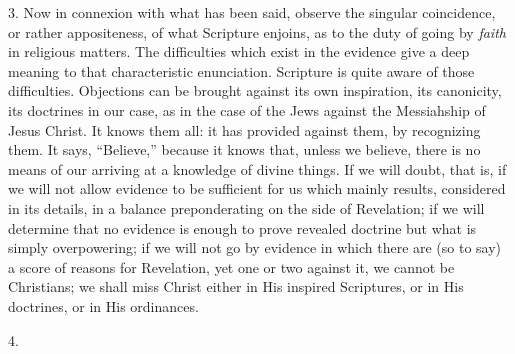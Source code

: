 3. Now in connexion with what has been said, observe the singular
coincidence, or rather appositeness, of what Scripture enjoins, as to
the duty of going by \emph{faith} in religious matters. The
difficulties which exist in the evidence give a deep meaning to that
characteristic enunciation. Scripture is quite aware of those
difficulties. Objections can be brought against its own inspiration,
its canonicity, its doctrines in our case, as in the case of the Jews
against the Messiahship of Jesus Christ. It knows them all: it has
provided against them, by recognizing them. It says,
``Believe,'' because it knows that, unless we believe, there
is no means of our arriving at a knowledge of divine things. If we
will doubt, that is, if we will not allow evidence to be sufficient
for us which mainly results, considered in its details, in a balance
preponderating on the side of Revelation; if we will determine that no
evidence is enough to prove revealed doctrine but what is simply
overpowering; if we will not go by evidence in which there are (so to
say) a score of reasons for Revelation, yet one or two against it, we
cannot be Christians; we shall miss Christ either in His inspired
Scriptures, or in His doctrines, or in His ordinances.

4.

